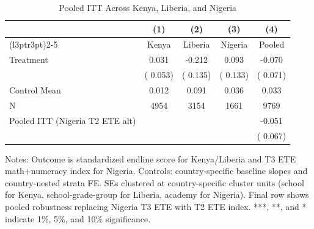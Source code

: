 \begin{table}[!htbp]
\centering
\caption{Pooled ITT Across Kenya, Liberia, and Nigeria}
\label{tab:pooled_itt}
\begin{threeparttable}
\begin{tabular}[t]{lcccc}
\toprule
 & (1) & (2) & (3) & (4) \\
\cmidrule(l{3pt}r{3pt}){2-5}
 & Kenya & Liberia & Nigeria & Pooled \\
\midrule
Treatment &   0.031 &  -0.212 &   0.093 &  -0.070 \\
 & (  0.053) & (  0.135) & (  0.133) & (  0.071) \\
\addlinespace
Control Mean &   0.012 &   0.091 &   0.036 &   0.033 \\
N & 4954 & 3154 & 1661 & 9769 \\
\addlinespace
Pooled ITT (Nigeria T2 ETE alt) & \multicolumn{3}{c}{ } &  -0.051 \\
 & \multicolumn{3}{c}{ } & (  0.067) \\
\bottomrule
\end{tabular}
\begin{tablenotes}[para]
\item Notes: Outcome is standardized endline score for Kenya/Liberia and T3 ETE math+numeracy index for Nigeria.
Controls: country-specific baseline slopes and country-nested strata FE.
SEs clustered at country-specific cluster units (school for Kenya, school\mbox{-}grade\mbox{-}group for Liberia, academy for Nigeria).
Final row shows pooled robustness replacing Nigeria T3 ETE with T2 ETE index.
***, **, and * indicate 1\%, 5\%, and 10\% significance.
\end{tablenotes}
\end{threeparttable}
\end{table}
